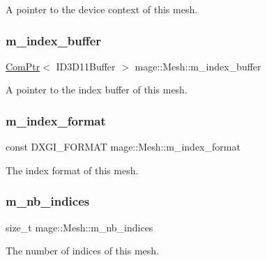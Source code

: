 A pointer to the device context of this mesh. \hypertarget{classmage_1_1_mesh_abe29363ebac77b284ca69532fd5b3373}{}\label{classmage_1_1_mesh_abe29363ebac77b284ca69532fd5b3373} 
\subsubsection{\texorpdfstring{m\+\_\+index\+\_\+buffer}{m\_index\_buffer}}
{\footnotesize\ttfamily \hyperlink{namespacemage_ae74f374780900893caa5555d1031fd79}{Com\+Ptr}$<$ I\+D3\+D11\+Buffer $>$ mage\+::\+Mesh\+::m\+\_\+index\+\_\+buffer\hspace{0.3cm}{\ttfamily [protected]}}

A pointer to the index buffer of this mesh. \hypertarget{classmage_1_1_mesh_a93dbb92d756948df3b08fc29426c6acf}{}\label{classmage_1_1_mesh_a93dbb92d756948df3b08fc29426c6acf} 
\subsubsection{\texorpdfstring{m\+\_\+index\+\_\+format}{m\_index\_format}}
{\footnotesize\ttfamily const D\+X\+G\+I\+\_\+\+F\+O\+R\+M\+AT mage\+::\+Mesh\+::m\+\_\+index\+\_\+format\hspace{0.3cm}{\ttfamily [private]}}

The index format of this mesh. \hypertarget{classmage_1_1_mesh_a5e3baa9e2b2e9b4ce795a456f76d87b2}{}\label{classmage_1_1_mesh_a5e3baa9e2b2e9b4ce795a456f76d87b2} 
\subsubsection{\texorpdfstring{m\+\_\+nb\+\_\+indices}{m\_nb\_indices}}
{\footnotesize\ttfamily size\+\_\+t mage\+::\+Mesh\+::m\+\_\+nb\+\_\+indices\hspace{0.3cm}{\ttfamily [private]}}

The number of indices of this mesh. \hypertarget{classmage_1_1_mesh_a5a04aa73e98c75dd5b8929296c3af9bb}{}\label{classmage_1_1_mesh_a5a04aa73e98c75dd5b8929296c3af9bb} 
